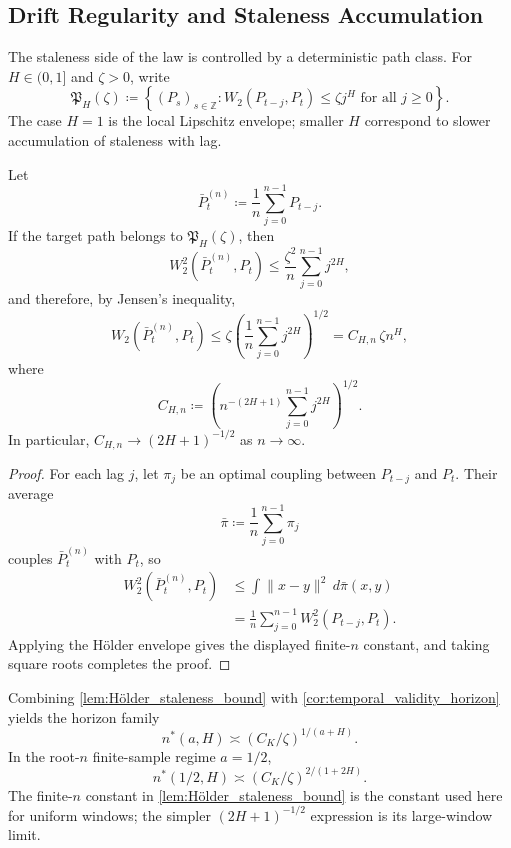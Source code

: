 \subsection{Drift Regularity and Staleness Accumulation}

The staleness side of the law is controlled by a deterministic path class. For
$H\in(0,1]$ and $\zeta>0$, write
\[
  \mathfrak P_H(\zeta)
  \coloneqq
  \left\{(P_s)_{s\in\mathbb Z}: W_2(P_{t-j},P_t) \le \zeta j^H
  \text{ for all } j\ge 0\right\}.
\]
The case $H=1$ is the local Lipschitz envelope; smaller $H$ correspond to slower
accumulation of staleness with lag.

\begin{lemma}
\label{lem:Hölder_staleness_bound}
Let
\[
  \bar P_t^{(n)} \coloneqq \frac{1}{n}\sum_{j=0}^{n-1} P_{t-j}.
\]
If the target path belongs to $\mathfrak P_H(\zeta)$, then
\[
  W_2^2\!\left(\bar P_t^{(n)},P_t\right)
  \le
  \frac{\zeta^2}{n}\sum_{j=0}^{n-1} j^{2H},
\]
and therefore, by Jensen's inequality,
\[
  W_2\!\left(\bar P_t^{(n)},P_t\right)
  \le \zeta\left(\frac{1}{n}\sum_{j=0}^{n-1} j^{2H}\right)^{1/2}
  = C_{H,n}\,\zeta n^H,
\]
where
\[
  C_{H,n}
  \coloneqq
  \left(n^{-(2H+1)}\sum_{j=0}^{n-1} j^{2H}\right)^{1/2}.
\]
In particular, $C_{H,n}\to (2H+1)^{-1/2}$ as $n\to\infty$.
\end{lemma}

\begin{proof}
For each lag $j$, let $\pi_j$ be an optimal coupling between $P_{t-j}$ and $P_t$.
Their average
\[
  \bar \pi \coloneqq \frac{1}{n}\sum_{j=0}^{n-1} \pi_j
\]
couples $\bar P_t^{(n)}$ with $P_t$, so
\[
  \begin{aligned}
  W_2^2\!\left(\bar P_t^{(n)},P_t\right)
  &\le \int \|x-y\|^2\,d\bar\pi(x,y) \\
  &= \frac{1}{n}\sum_{j=0}^{n-1} W_2^2\!\left(P_{t-j},P_t\right).
  \end{aligned}
\]
Applying the Hölder envelope gives the displayed finite-$n$ constant, and taking
square roots completes the proof.
\end{proof}

Combining \cref{lem:Hölder_staleness_bound} with
\cref{cor:temporal_validity_horizon} yields the horizon family
\[
  n^*(a,H) \asymp (C_K/\zeta)^{1/(a+H)}.
\]
In the root-$n$ finite-sample regime $a=1/2$,
\[
  n^*(1/2,H) \asymp (C_K/\zeta)^{2/(1+2H)}.
\]
The finite-$n$ constant in
\cref{lem:Hölder_staleness_bound} is the constant used here for
uniform windows; the simpler $(2H+1)^{-1/2}$ expression is its large-window
limit.

